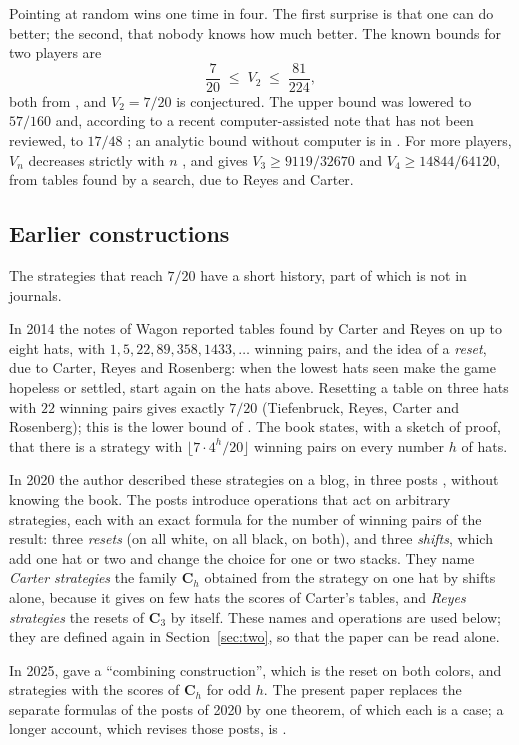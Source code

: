 \documentclass[11pt,a4paper]{article}
\theoremstyle{definition}
\theoremstyle{remark}
\newcommand{\C}{\mathbf{C}}
\begin{document}
Pointing at random wins one time in four. The first surprise is that one
can do better; the second, that nobody knows how much better. The known
bounds for two players are
\[
  \frac{7}{20} \;\le\; V_2 \;\le\; \frac{81}{224} ,
\]
both from \cite{BFG}, and $V_2 = 7/20$ is conjectured. The upper bound
was lowered to $57/160$ and, according to a recent computer-assisted
note that has not been reviewed, to $17/48$ \cite{Ya26}; an analytic
bound without computer is in \cite{HT25}. For more players, $V_n$
decreases strictly with $n$ \cite{FKK21,AFKK}, and \cite{BFG} gives
$V_3 \ge 9119/32670$ and $V_4 \ge 14844/64120$, from tables found by a
search, due to Reyes and Carter.

\subsection{Earlier constructions}

The strategies that reach $7/20$ have a short history, part of which is
not in journals.

In 2014 the notes of Wagon \cite{Wa14} reported tables found by Carter
and Reyes on up to eight hats, with $1, 5, 22, 89, 358, 1433, \ldots$
winning pairs, and the idea of a \emph{reset}, due to Carter, Reyes and
Rosenberg: when the lowest hats seen make the game hopeless or settled,
start again on the hats above. Resetting a table on three hats with $22$
winning pairs gives exactly $7/20$ (Tiefenbruck, Reyes, Carter and
Rosenberg); this is the lower bound of \cite{BFG}. The book \cite{VW20}
states, with a sketch of proof, that there is a strategy with
$\lfloor 7\cdot 4^h/20\rfloor$ winning pairs on every number $h$ of hats.

In 2020 the author described these strategies on a blog, in three posts
\cite{R20}, without knowing the book. The posts introduce operations
that act on arbitrary strategies, each with an exact formula for the
number of winning pairs of the result: three \emph{resets} (on all
white, on all black, on both), and three \emph{shifts}, which add one
hat or two and change the choice for one or two stacks. They name
\emph{Carter strategies} the family $\C_h$ obtained from the strategy on
one hat by shifts alone, because it gives on few hats the scores of
Carter's tables, and \emph{Reyes strategies} the resets of $\C_3$ by
itself. These names and operations are used below; they are defined
again in Section~\ref{sec:two}, so that the paper can be read alone.

In 2025, \cite{BCCZW} gave a ``combining construction'', which is the
reset on both colors, and strategies with the scores of $\C_h$ for odd
$h$. The present paper replaces the separate formulas of the posts of
2020 by one theorem, of which each is a case; a longer account, which
revises those posts, is \cite{web}.
\end{document}
